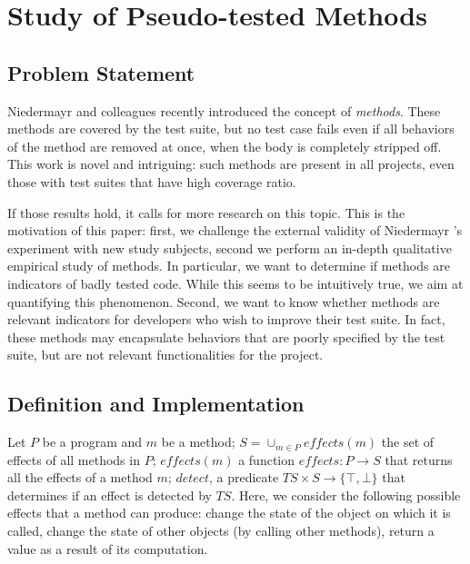 \section{Study of Pseudo-tested Methods}
\label{sec:transversal-contributions:descartes}


\subsection{Problem Statement}
\label{subsec:transversal-contributions:descartes:introduction}

Niedermayr and colleagues \cite{niedermayr_will_2016} recently introduced the concept of \emph{\pseudotested{} methods}. 
These methods are covered by the test suite, but no test case fails even if all behaviors of the method are removed at once, \ie when the body is completely stripped off.
This work is novel and intriguing:
such \pseudotested{} methods are present in all projects, even those with test suites that have high coverage ratio.

If those results hold, it calls for more research on this topic.
This is the motivation of this paper: 
first, we challenge the external validity of Niedermayr \etal's experiment with new study subjects, 
second we perform an in-depth qualitative empirical study of \pseudotested{} methods. 
In particular, we want to determine if \pseudotested{} methods are indicators of badly tested code. 
While this seems to be intuitively true, we aim at quantifying this phenomenon.
Second, we want to know whether \pseudotested{} methods are relevant indicators for developers who wish to improve their test suite. 
In fact, these methods may encapsulate behaviors that are poorly specified by the test suite, but are not relevant functionalities for the project.

\subsection{Definition and Implementation}
\label{subsec:transversal-contributions:descartes:definitions}

Let $P$ be a program and $m$ be a method; $S=\cup_{m \in P}{\mathit{effects}(m)}$ the set of effects of all methods in $P$; 
$\mathit{effects}(m)$ a function $\mathit{effects}:P \rightarrow S$ that returns all the effects of a method $m$; $detect$, a predicate $TS \times S \rightarrow \{\top, \bot\}$ that determines if an effect is detected by $TS$.
Here, we consider the following possible effects that a method can produce: 
change the state of the object on which it is called, change the state of other objects (by calling other methods), return a value as a result of its computation.

